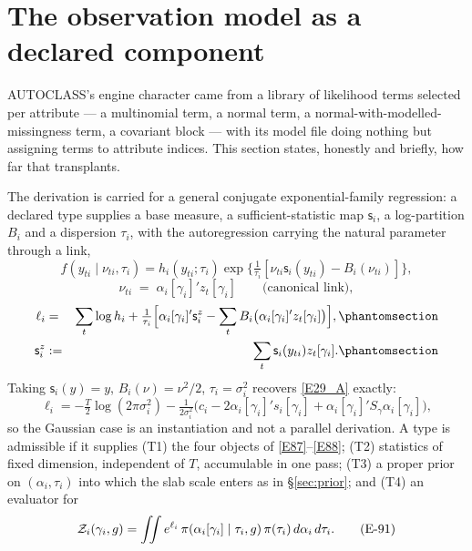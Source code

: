\section[The observation model]{The observation model as a declared component}\label{sec:obs}

AUTOCLASS's engine character came from a library of likelihood terms selected per
attribute --- a multinomial term, a normal term, a normal-with-modelled-missingness
term, a covariant block --- with its model file doing nothing but assigning terms to
attribute indices. This section states, honestly and briefly, how far that
transplants.

The derivation is carried for a general conjugate exponential-family regression: a
declared type supplies a base measure, a sufficient-statistic map $\mathsf{s}_i$, a
log-partition $B_i$ and a dispersion $\tau_i$, with the autoregression carrying the
natural parameter through a link,
\begin{equation}
f(y_{ti}\mid\nu_{ti},\tau_i) = h_i(y_{ti};\tau_i)\exp\bigl\{\tfrac{1}{\tau_i}
[\nu_{ti}\mathsf{s}_i(y_{ti})-B_i(\nu_{ti})]\bigr\},
\tag{E-87}\label{E87}
\end{equation}
\begin{equation}
\nu_{ti} \;=\; \alpha_i[\gamma_i]'z_t[\gamma_i] \qquad \text{(canonical link)},
\tag{E-88}\label{E88}
\end{equation}
\begin{eqnarray}
\ell_i &=& \sum_t\log h_i + \tfrac{1}{\tau_i}\Bigl[\alpha_i[\gamma_i]'\mathsf{s}_i^z
  - \sum_tB_i\bigl(\alpha_i[\gamma_i]'z_t[\gamma_i]\bigr)\Bigr],
  \Elabel{E-89A}{E89_A} \\
\mathsf{s}_i^z &:=& \sum_t\mathsf{s}_i(y_{ti})z_t[\gamma_i].
  \Elabel{E-89B}{E89_B}
\end{eqnarray}
Taking $\mathsf{s}_i(y)=y$, $B_i(\nu)=\nu^2/2$, $\tau_i=\sigma_i^2$ recovers
\eqref{E29_A} exactly:
\begin{equation}
\ell_i = -\tfrac{T}{2}\log(2\pi\sigma_i^2) - \tfrac{1}{2\sigma_i^2}\bigl(c_i
- 2\alpha_i[\gamma_i]'s_i[\gamma_i] + \alpha_i[\gamma_i]'S_\gamma\alpha_i[\gamma_i]\bigr),
\tag{E-90}\label{E90}
\end{equation}
so the Gaussian case is an instantiation and not a parallel derivation. A type is
admissible if it supplies (T1) the four objects of \eqref{E87}--\eqref{E88}; (T2)
statistics of fixed dimension, independent of $T$, accumulable in one pass; (T3) a
proper prior on $(\alpha_i,\tau_i)$ into which the slab scale enters as in
\S\ref{sec:prior}; and (T4) an evaluator for
\begin{equation}
\mathcal{Z}_i(\gamma_i,g) = \iint e^{\ell_i}\,\pi(\alpha_i[\gamma_i]\mid\tau_i,g)\,
\pi(\tau_i)\,d\alpha_i\,d\tau_i.
\tag{E-91}\label{E91}
\end{equation}

